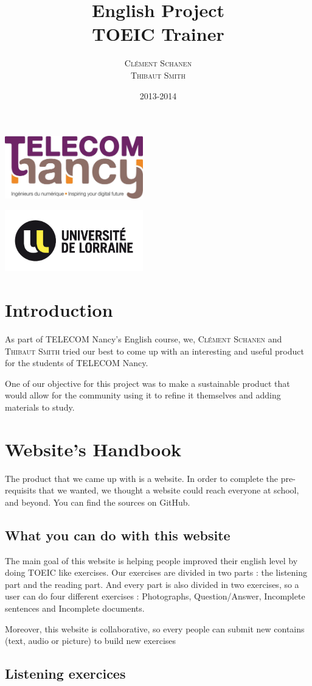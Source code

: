 \documentclass[12pt,a4paper]{report}
\title{English Project \\ \textbf{TOEIC Trainer}}
\author{\textsc{Clément Schanen} \\ \textsc{Thibaut Smith}}
\date{2013-2014}
\makeatletter
\def\maketitle{
\begin{minipage}{0.54\textwidth}
\begin{flushleft} \large
\LARGE \@author
\end{flushleft}
\end{minipage}
\begin{minipage}{0.4\textwidth}
\begin{flushright} \large
\end{flushright}
\end{minipage}
  \vfill
  \begin{center}\leavevmode
    \normalfont
    {\LARGE \@title\par}%
    {\Large \@date\par}
    \vskip 1cm
  \end{center}%
  \vfill
  \hfill
  
\begin{minipage}{0.54\textwidth}
\begin{flushleft} \large
\includegraphics[width=6cm]{telecomnancy.jpg}


\end{flushleft}
\end{minipage}
\begin{minipage}{0.4\textwidth}
\begin{flushright} \large
\includegraphics[width=6cm]{univ-lorraine.jpg}
\end{flushright}
\end{minipage}
  \cleardoublepage
  }
\makeatother
\begin{document}
\pagestyle{empty} %

\maketitle %

\pagestyle{plain}
\setcounter{page}{2}

\tableofcontents
\section*{Introduction}
As part of TELECOM Nancy's English course, we, \textsc{Clément Schanen} and
\textsc{Thibaut Smith} tried our best to come up with an interesting and
useful product for the students of TELECOM Nancy.

One of our objective for this project was to make a sustainable product that
would allow for the community using it to refine it themselves and adding
materials to study.

\pagebreak
\section{Website's Handbook}

The product that we came up with is a website\cite{TOEICTrainer}. In order to complete the pre-requisits that we wanted, we thought a website could reach everyone at school, and beyond. You can find the sources on GitHub\cite{github_tc}.

\subsection{What you can do with this website}

The main goal of this website is helping people improved their english level by doing TOEIC like exercises. Our exercises are divided in two parts : the listening part and the reading part. And every part is also divided in two exercises, so a user can do four different exercises : Photographs, Question/Answer, Incomplete sentences and Incomplete documents.

Moreover, this website is collaborative, so every people can submit new contains (text, audio or picture) to build new exercises

\subsection{Listening exercices}
\end{document}
